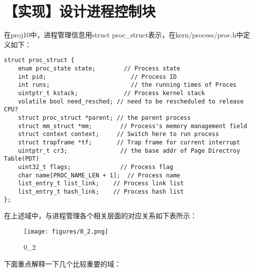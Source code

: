 \section{【实现】设计进程控制块}\label{ux5b9eux73b0ux8bbeux8ba1ux8fdbux7a0bux63a7ux5236ux5757}

在proj10中，进程管理信息用struct
proc\_struct表示，在kern/process/proc.h中定义如下：

\begin{lstlisting}
struct proc_struct {
    enum proc_state state;        // Process state
    int pid;                        // Process ID
    int runs;                       // the running times of Proces
    uintptr_t kstack;             // Process kernel stack
    volatile bool need_resched; // need to be rescheduled to release CPU?
    struct proc_struct *parent; // the parent process
    struct mm_struct *mm;        // Process's memory management field
    struct context context;     // Switch here to run process
    struct trapframe *tf;       // Trap frame for current interrupt
    uintptr_t cr3;               // the base addr of Page Directroy Table(PDT)
    uint32_t flags;              // Process flag
    char name[PROC_NAME_LEN + 1];  // Process name
    list_entry_t list_link;    // Process link list 
    list_entry_t hash_link;    // Process hash list
};
\end{lstlisting}

在上述域中，与进程管理各个相关层面的对应关系如下表所示：

\begin{figure}[htbp]
\centering
\texttt{[image: figures/0\_2.png]}
\caption{0\_2}
\end{figure}

下面重点解释一下几个比较重要的域：

